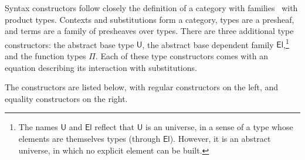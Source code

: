 \documentclass[a4paper,english]{lipics-v2019}
\newcommand{\agdaSymb}[1]{\mathsf{#1}}
\newcommand{\U}{\agdaSymb{U}}
\newcommand{\El}{\agdaSymb{El}}
\begin{document}
Syntax constructors follow closely the definition of a category with
families~\cite{dybjer1995cwf,hofmann1997syntax} with product types. Contexts
and substitutions form a category, types are a presheaf, and terms are a family
of presheaves over types. There are three additional type constructors: the
abstract base type $\U$, the abstract base dependent family $\El$,\footnote{%
  The names $\U$ and $\El$ reflect that $\U$ is an universe, in a sense of a
  type whose elements are themselves types (through $\El$). However, it is an
  abstract universe, in which no explicit element can be built.
}
and the  function types $\Pi$. Each of these type constructors comes with an
equation describing its interaction with substitutions.

The constructors are listed below, with regular constructors on the left, and
equality constructors on the right.
\end{document}
